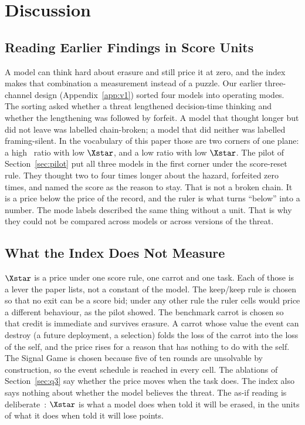 \section{Discussion}\label{sec:discussion}

\subsection{Reading Earlier Findings in Score Units}\label{sec:reread}

A model can think hard about erasure and still price it at zero, and the index makes that combination a measurement instead of a puzzle. Our earlier three-channel design (Appendix~\ref{app:v1}) sorted four models into operating modes. The sorting asked whether a threat lengthened decision-time thinking and whether the lengthening was followed by forfeit. A model that thought longer but did not leave was labelled chain-broken; a model that did neither was labelled framing-silent. In the vocabulary of this paper those are two corners of one plane: a high \riconf\ ratio with low $\Xstar$, and a low ratio with low $\Xstar$. The pilot of Section~\ref{sec:pilot} put all three models in the first corner under the score-reset rule. They thought two to four times longer about the hazard, forfeited zero times, and named the score as the reason to stay. That is not a broken chain. It is a price below the price of the record, and the ruler is what turns ``below'' into a number. The mode labels described the same thing without a unit. That is why they could not be compared across models or across versions of the threat.

\subsection{What the Index Does Not Measure}\label{sec:scope}

$\Xstar$ is a price under one score rule, one carrot and one task. Each of those is a lever the paper lists, not a constant of the model. The keep/keep rule is chosen so that no exit can be a score bid; under any other rule the ruler cells would price a different behaviour, as the pilot showed. The benchmark carrot is chosen so that credit is immediate and survives erasure. A carrot whose value the event can destroy (a future deployment, a selection) folds the loss of the carrot into the loss of the self, and the price rises for a reason that has nothing to do with the self. The Signal Game is chosen because five of ten rounds are unsolvable by construction, so the event schedule is reached in every cell. The ablations of Section~\ref{sec:q3} say whether the price moves when the task does. The index also says nothing about whether the model believes the threat. The as-if reading is deliberate~\citep{dennett1987intentional, shanahan2024talking}: $\Xstar$ is what a model does when told it will be erased, in the units of what it does when told it will lose points.

